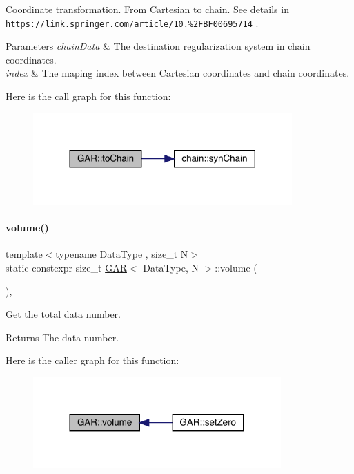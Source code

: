 Coordinate transformation. From Cartesian to chain. See details in \href{https://link.springer.com/article/10.1007%2FBF00695714}{\tt https\+://link.\+springer.\+com/article/10.\%2\+F\+B\+F00695714} . 
\begin{DoxyParams}{Parameters}
{\em chain\+Data} & The destination regularization system in chain coordinates. \\
\hline
{\em index} & The maping index between Cartesian coordinates and chain coordinates. \\
\hline
\end{DoxyParams}
Here is the call graph for this function\+:\nopagebreak
\begin{figure}[H]
\begin{center}
\leavevmode
\includegraphics[width=281pt]{class_g_a_r_a18041ac48dc47e6ada3e8a33893b1200_cgraph}
\end{center}
\end{figure}
\mbox{\label{class_g_a_r_abdbcc31db058125bd2ee207e7648b20b}} 
\paragraph{\texorpdfstring{volume()}{volume()}}
{\footnotesize\ttfamily template$<$typename Data\+Type , size\+\_\+t N$>$ \\
static constexpr size\+\_\+t \mbox{\hyperlink{class_g_a_r}{G\+AR}}$<$ Data\+Type, N $>$\+::volume (\begin{DoxyParamCaption}{ }\end{DoxyParamCaption})\hspace{0.3cm}{\ttfamily [inline]}, {\ttfamily [static]}}



Get the total data number. 

\begin{DoxyReturn}{Returns}
The data number. 
\end{DoxyReturn}
Here is the caller graph for this function\+:\nopagebreak
\begin{figure}[H]
\begin{center}
\leavevmode
\includegraphics[width=269pt]{class_g_a_r_abdbcc31db058125bd2ee207e7648b20b_icgraph}
\end{center}
\end{figure}


